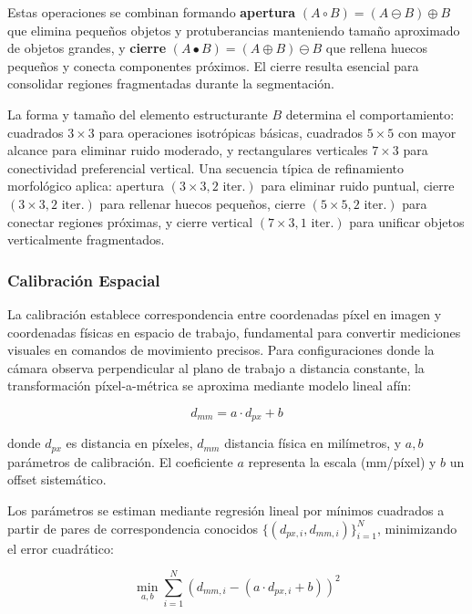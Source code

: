 Estas operaciones se combinan formando \textbf{apertura} $(A \circ B) = (A \ominus B) \oplus B$ que elimina pequeños objetos y protuberancias manteniendo tamaño aproximado de objetos grandes, y \textbf{cierre} $(A \bullet B) = (A \oplus B) \ominus B$ que rellena huecos pequeños y conecta componentes próximos. El cierre resulta esencial para consolidar regiones fragmentadas durante la segmentación.

La forma y tamaño del elemento estructurante $B$ determina el comportamiento: cuadrados $3 \times 3$ para operaciones isotrópicas básicas, cuadrados $5 \times 5$ con mayor alcance para eliminar ruido moderado, y rectangulares verticales $7 \times 3$ para conectividad preferencial vertical. Una secuencia típica de refinamiento morfológico aplica: apertura $(3 \times 3, 2 \text{ iter.})$ para eliminar ruido puntual, cierre $(3 \times 3, 2 \text{ iter.})$ para rellenar huecos pequeños, cierre $(5 \times 5, 2 \text{ iter.})$ para conectar regiones próximas, y cierre vertical $(7 \times 3, 1 \text{ iter.})$ para unificar objetos verticalmente fragmentados.

\subsubsection{Calibración Espacial}

La calibración establece correspondencia entre coordenadas píxel en imagen y coordenadas físicas en espacio de trabajo, fundamental para convertir mediciones visuales en comandos de movimiento precisos. Para configuraciones donde la cámara observa perpendicular al plano de trabajo a distancia constante, la transformación píxel-a-métrica se aproxima mediante modelo lineal afín:

\begin{equation}
d_{mm} = a \cdot d_{px} + b
\end{equation}

donde $d_{px}$ es distancia en píxeles, $d_{mm}$ distancia física en milímetros, y $a, b$ parámetros de calibración. El coeficiente $a$ representa la escala (mm/píxel) y $b$ un offset sistemático.

Los parámetros se estiman mediante regresión lineal por mínimos cuadrados a partir de pares de correspondencia conocidos $\{(d_{px,i}, d_{mm,i})\}_{i=1}^{N}$, minimizando el error cuadrático:

\begin{equation}
\min_{a,b} \sum_{i=1}^{N} (d_{mm,i} - (a \cdot d_{px,i} + b))^2
\end{equation}

